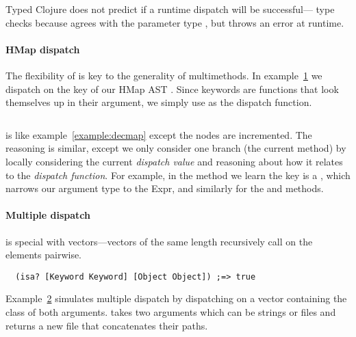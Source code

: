 Typed Clojure does not predict if a runtime dispatch will be successful--- 
type checks because  agrees with the parameter type ,
but throws an error at runtime.

\paragraph{HMap dispatch} The flexibility of  is key to the generality of multimethods. 
In example~\ref{example:incmap} we
dispatch on the  key 
of our HMap AST .
Since keywords are functions that look themselves up in their argument, we simply
use  as the dispatch function.

\begin{figure}
\begin{exmp}
\inputminted[firstline=5,lastline=18]{clojure}{code/demo/src/demo/eg5.clj}
\label{example:incmap}
\end{exmp}
\end{figure}

 is like example~\ref{example:decmap} except the nodes are incremented.
The reasoning is similar, except we only consider one branch (the current method) by
locally considering the current \emph{dispatch value} and reasoning about how it relates
to the \emph{dispatch function}.
For example, 
in the  method we learn the  key is a , which
narrows our argument type to the  Expr, and similarly for the 
and  methods.

\paragraph{Multiple dispatch}  is special with vectors---vectors of the
same length recursively call  on the elements pairwise.
\begin{verbatim}
  (isa? [Keyword Keyword] [Object Object]) ;=> true
\end{verbatim}

Example~\ref{example:multidispatch}
simulates multiple dispatch by dispatching on
a vector containing the class of both arguments. 
takes two arguments which can be strings or files and returns
a new file that concatenates their paths.

\begin{figure}
\begin{exmp}
\inputminted[firstline=6,lastline=22]{clojure}{code/demo/src/demo/eg7.clj}
\label{example:multidispatch}
\end{exmp}
\end{figure}

